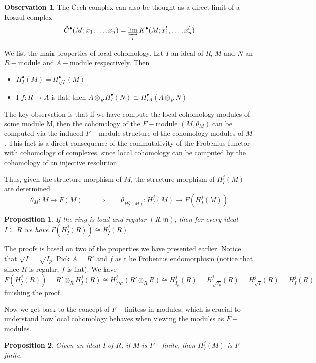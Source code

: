\documentclass[leqno]{article}
\newtheorem{proposition}{Proposition}[section]
\theoremstyle{definition}
\newtheorem{observation}{Observation}[section]
\begin{document}
\begin{observation}The \v{C}ech complex can also be thought as a direct limit of a Koszul complex
  \[
	\check{C}^{\bullet}(M; x_1, \ldots, x_n) = \varinjlim_{l} K^{\bullet}(M; x_1^l, \ldots, x_n^l)
  \] 
\end{observation}

We list the main properties of local cohomology. Let $I$ an ideal of  $R$, $M$ and $N$ an $R-$module and $A-$module respectively. Then
\begin{itemize}[topsep=-6pt, itemsep=0pt]
  \item $H^\bullet_I(M) = H^\bullet_{\sqrt{I} }(M)$ 
  \item I $f:R\to A$ is flat, then $A\otimes _RH^\bullet_I(N) \cong H_{IA}^\bullet(A\otimes_R N)$
\end{itemize}

The key observation is that if we have compute the local cohomology modules of some module M, then the cohomology of the $F-$module $(M, \theta_M)$ can be computed via the induced $F-$module structure of the cohomology modules of $M$. This fact is a direct consequence of the commutativity of the Frobenius functor with cohomology of complexes, since local cohomology can be computed by the cohomology of an injective resolution.

Thus, given the structure morphism of $M$, the structure morphism of $H_I^j(M)$ are determined
 \[
\theta_M : M \to F(M)  \qquad \Longrightarrow \qquad
\theta_{H_I^j (M)} : H_{I}^j(M) \to F(H_I^j(M))
\] 

\begin{proposition} If the ring is local and regular $(R, \mathfrak{m})$, then for every ideal $I\subseteq R$ we have $F(H_I^j(R)) \cong  H_{I}^j(R)$
\end{proposition}

The proofs is based on two of the properties we have presented earlier. Notice that $\sqrt{I}=\sqrt{I_p}$. Pick $A = R'$ and $f$ as t he Frobenius endomorphism (notice that since $R$ is regular, $f$ is flat). We have
\[
F(H_I^j(R)) = R'\otimes _RH_I^j(R) \cong H_{IR'}^j(R'\otimes _R R) \cong H_{I_p}^j(R) = H_{\sqrt{I_p}}^j(R) = H_{\sqrt{I}}^j(R)= H_{I}^j(R)
\] 
finishing the proof.

Now we get back to the concept of $F-$finitess in modules, which is crucial to understand how local cohomology behaves when viewing the modules as $F-$modules.

 \begin{proposition} Given an ideal $I$ of $R$, if $M$ is $F-$finite, then  $H^j_I(M)$ is  $F-$finite.
\end{proposition}
\end{document}
